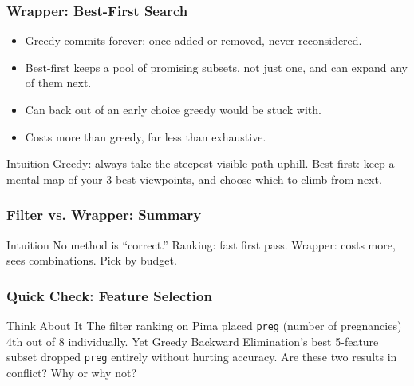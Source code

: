 \begin{frame}[fragile]\frametitle{Wrapper: Best-First Search}
\begin{itemize}
\item Greedy commits forever: once added or removed, never reconsidered.
\item Best-first keeps a pool of promising subsets, not just one, and can expand any of them next.
\item Can back out of an early choice greedy would be stuck with.
\item Costs more than greedy, far less than exhaustive.
\end{itemize}

\begin{block}{Intuition}
Greedy: always take the steepest visible path uphill. Best-first: keep a mental map of your 3 best viewpoints, and choose which to climb from next.
\end{block}
\end{frame}

\begin{frame}[fragile]\frametitle{Filter vs. Wrapper: Summary}
\begin{center}
\small
{}
\end{center}
\begin{block}{Intuition}
No method is ``correct.'' Ranking: fast first pass. Wrapper: costs more, sees combinations. Pick by budget.
\end{block}
\end{frame}

\begin{frame}[fragile]\frametitle{Quick Check: Feature Selection}
\begin{block}{Think About It}
The filter ranking on Pima placed \texttt{preg} (number of pregnancies) 4th out of 8 individually. Yet Greedy Backward Elimination's best 5-feature subset dropped \texttt{preg} entirely without hurting accuracy. Are these two results in conflict? Why or why not?
\end{block}
\end{frame}

